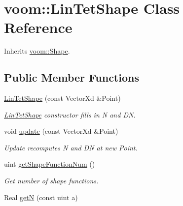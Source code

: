 \hypertarget{classvoom_1_1_lin_tet_shape}{
\section{voom::LinTetShape Class Reference}
\label{classvoom_1_1_lin_tet_shape}
}


Inherits \hyperlink{classvoom_1_1_shape}{voom::Shape}.\subsection*{Public Member Functions}
\begin{DoxyCompactItemize}
\item 
\hypertarget{classvoom_1_1_lin_tet_shape_aeaf5fe683c25acad97997d93ad619916}{
\hyperlink{classvoom_1_1_lin_tet_shape_aeaf5fe683c25acad97997d93ad619916}{LinTetShape} (const VectorXd \&Point)}
\label{classvoom_1_1_lin_tet_shape_aeaf5fe683c25acad97997d93ad619916}

\begin{DoxyCompactList}\small\item\em \hyperlink{classvoom_1_1_lin_tet_shape}{LinTetShape} constructor fills in N and DN. \item\end{DoxyCompactList}\item 
void \hyperlink{classvoom_1_1_lin_tet_shape_a9a1ac89c0cfd33e4d1eb459b2d9c595e}{update} (const VectorXd \&Point)
\begin{DoxyCompactList}\small\item\em Update recomputes N and DN at new Point. \item\end{DoxyCompactList}\item 
\hypertarget{classvoom_1_1_lin_tet_shape_ade89d5247ed9f40ac0ea4e5321e53a65}{
uint \hyperlink{classvoom_1_1_lin_tet_shape_ade89d5247ed9f40ac0ea4e5321e53a65}{getShapeFunctionNum} ()}
\label{classvoom_1_1_lin_tet_shape_ade89d5247ed9f40ac0ea4e5321e53a65}

\begin{DoxyCompactList}\small\item\em Get number of shape functions. \item\end{DoxyCompactList}\item 
\hypertarget{classvoom_1_1_lin_tet_shape_a8ebb8d291f00071d9015dddf7ce14134}{
Real \hyperlink{classvoom_1_1_lin_tet_shape_a8ebb8d291f00071d9015dddf7ce14134}{getN} (const uint a)}
\label{classvoom_1_1_lin_tet_shape_a8ebb8d291f00071d9015dddf7ce14134}


\end{DoxyCompactItemize}
